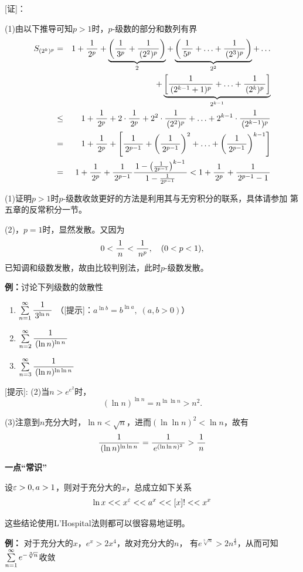 [证]：
\begin{shaded}
(1)由以下推导可知$p>1$时，$p$-级数的部分和数列有界
\begin{eqnarray*}
	S_{(2^k)^p}&=&1+\df 1{2^p}+\underbrace{\left(\df1{3^p}+\df1{(2^2)^p}\right)}_2
				+\underbrace{\left(\df1{5^p}+\ldots+\df1{(2^3)^p}\right)}_{2^2}+\ldots\\
				&&+\underbrace{\left[\df1{(2^{k-1}+1)^p}+\ldots+\df1{(2^k)^p}\right]}_{2^{k-1}}\\
			  &\leq &1+\df 1{2^p}+2\cdot\df1{2^p}+2^2\cdot\df1{(2^2)^p}
			    +\ldots+2^{k-1}\cdot\df1{(2^{k-1})^p}\\
			  &=&1+\df 1{2^p}+\left[\df1{2^{p-1}}+\left(\df1{2^{p-1}}\right)^2+
			    \ldots+\left(\df1{2^{p-1}}\right)^{k-1}\right]\\
			  &=&1+\df 1{2^p}+\df1{2^{p-1}}\df{1-\left(\frac1{2^{p-1}}\right)
			    ^{k-1}}{1-\frac1{2^{p-1}}}<1+\df 1{2^p}+\df1{2^{p-1}-1}
\end{eqnarray*}
\end{shaded}

(1)证明$p>1$时$p$-级数收敛更好的方法是利用其与无穷积分的联系，具体请参加
第五章的反常积分一节。

(2)，$p=1$时，显然发散。又因为
$$0<\df 1n<\df 1{n^p},\quad (0<p<1),$$
已知调和级数发散，故由比较判别法，此时$p$-级数发散。\fin

{\bf 例：}讨论下列级数的敛散性
\begin{enumerate}[(1)]
  \setlength{\itemindent}{1cm}
  \item $\sumn\df{1}{3^{\ln n}}$
  \hfill（{[提示]：$a^{\ln b}=b^{\ln a},\;(a,b>0)$}）
  \item $\sum\limits_{n=2}^{\infty}\df 1{(\ln n)^{\ln n}}$
  \item $\sum\limits_{n=3}^{\infty}\df 1{(\ln n)^{\ln\ln n}}$
\end{enumerate}
	
[提示]: (2)\;当$n>e^{e^2}$时，
$$(\ln n)^{\ln n}=n^{\ln\ln n}>n^2.$$

(3)\;注意到$n$充分大时，$\ln n<\sqrt{n}$，进而$(\ln\ln n)^2<\ln n$，故有
  $$\df 1{(\ln n)^{\ln\ln n}}=\df 1{e^{(\ln\ln
  n)^2}}>\df 1n$$

\begin{shaded}
	{\bf\color{red} 一点“常识”}
	
	{\color{red} 设$\e>0, a>1$，则对于充分大的$x$，总成立如下关系
	$$\ln x<<x^{\e}<<a^x<<[x]!<<x^x$$}

	这些结论使用L'Hospital法则都可以很容易地证明。
	
	{\bf 例：} 对于充分大的$x$，$e^x>2x^4$，故对充分大的$n$，
	有$e^{\sqrt[3]n}>2n^{\frac 43}$，从而可知$\sumn e^{-\sqrt[3]n}$收敛
\end{shaded}

